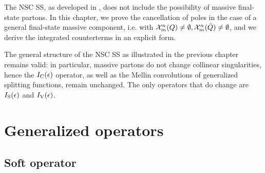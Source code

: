
The NSC SS, as developed in \cite{rontsch-2023, rontsch-2503, rontsch-2509}, does not include the possibility of massive final-state partons. In this chapter, we prove the cancellation of poles in the case of a general final-state massive component, i.e. with $ \mathcal{X}^{n}_{m}(Q) \neq \emptyset , \mathcal{X}^{n}_{m}(\bar{Q}) \neq \emptyset $, and we derive the integrated counterterms in an explicit form.

The general structure of the NSC SS as illustrated in the previous chapter remains valid: in particular, massive partons do not change collinear singularities, hence the $ I_\text{C}(\epsilon) $ operator, as well as the Mellin convolutions of generalized splitting functions, remain unchanged. The only operators that do change are $ I_\text{S}(\epsilon) $ and $ I_\text{V}(\epsilon) $.

\section{Generalized operators}

\subsection{Soft operator}

